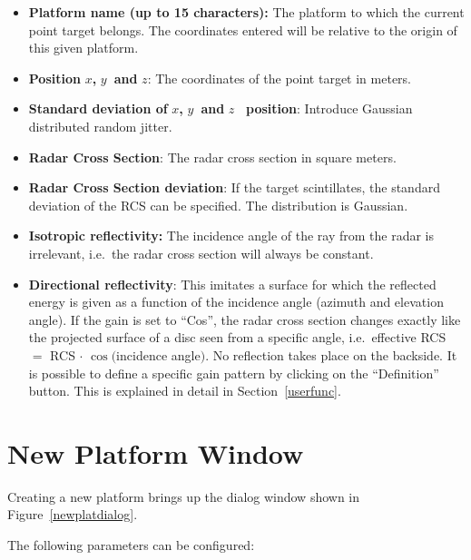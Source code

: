 \begin{itemize}
\item  \textbf{Platform name (up to 15 characters):} The platform to which
the current point target belongs. The coordinates entered will be relative
to the origin of this given platform.

\item  \textbf{Position }$x$\textbf{, }$y$\textbf{\ and }$z$: The
coordinates of the point target in meters.

\item  \textbf{Standard deviation of }$x$\textbf{, }$y$\textbf{\ and }$z$%
\textbf{\ position}: Introduce Gaussian distributed random jitter.

\item  \textbf{Radar Cross Section}: The radar cross section in square
meters.

\item  \textbf{Radar Cross Section deviation}: If the target scintillates,
the standard deviation of the RCS can be specified. The distribution is
Gaussian.

\item  \textbf{Isotropic reflectivity:} The incidence angle of the ray from
the radar is irrelevant, i.e.~the radar cross section will always be
constant.

\item  \textbf{Directional reflectivity}: This imitates a surface for which
the reflected energy is given as a function of the incidence angle (azimuth
and elevation angle). If the gain is set to ``Cos'', the radar cross section
changes exactly like the projected surface of a disc seen from a specific
angle, i.e.~effective RCS $=$ RCS $\cdot $ $\cos ($incidence angle$)$. No
reflection takes place on the backside. It is possible to define a specific
gain pattern by clicking on the ``Definition'' button. This is explained in
detail in Section~\ref{userfunc}.
\end{itemize}

\section{New Platform Window}

\label{newplatform}Creating a new platform brings up the dialog window shown
in Figure~\ref{newplatdialog}.

The
following parameters can be configured:

